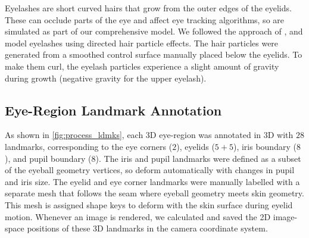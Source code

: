 Eyelashes are short curved hairs that grow from the outer edges of the eyelids.
These can occlude parts of the eye and affect eye tracking algorithms, so are simulated as part of our comprehensive model.
We followed the approach of \citet{swirski2014rendering}, and model eyelashes using directed hair particle effects.
The hair particles were generated from a smoothed control surface manually placed below the eyelids.
To make them curl, the eyelash particles experience a slight amount of gravity during growth (negative gravity for the upper eyelash).

\subsection{Eye-Region Landmark Annotation}

As shown in \autoref{fig:process_ldmks}, each 3D eye-region was annotated in 3D with $28$ landmarks, corresponding to the eye corners ($2$), eyelids ($5\!+\!5$), iris boundary ($8$), and pupil boundary ($8$).
The iris and pupil landmarks were defined as a subset of the eyeball geometry vertices, so deform automatically with changes in pupil and iris size.
The eyelid and eye corner landmarks were manually labelled with a separate mesh that follows the seam where eyeball geometry meets skin geometry.
This mesh is assigned shape keys to deform with the skin surface during eyelid motion.
%
%
Whenever an image is rendered, we calculated and saved the 2D image-space positions of these 3D landmarks in the camera coordinate system.